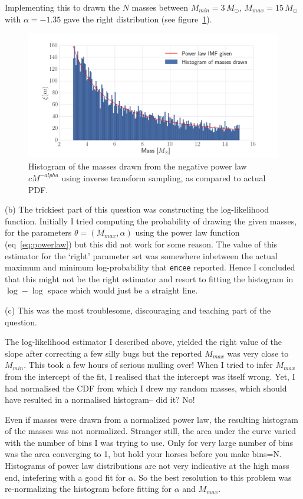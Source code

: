 \documentclass[12pt,usletter,english]{article}
\begin{document}
Implementing this to drawn the $N$ masses between $M_{min}=3 \,
M_{\odot}$, $M_{max}=15 \, M_{\odot}$ with $\alpha = -1.35$ gave the
right distribution (see figure~\ref{fig:powerlaw_masses}).

\begin{figure}[!h]
  \centering \includegraphics[width=13cm]{powerlaw_masses.png}
  \caption{Histogram of the masses drawn from the negative power law
    $cM^{-alpha}$ using inverse transform sampling, as compared to
    actual PDF. 
    \label{fig:powerlaw_masses}}
\end{figure}

(b) The trickiest part of this question was constructing the
log-likelihood function. Initially I tried computing the probability
of drawing the given masses, for the parameters $\theta =
(M_{max},\alpha)$ using the power law function (eq~\ref{eq:powerlaw})
but this did not work for some reason. The value of this estimator for
the `right' parameter set was somewhere inbetween the actual maximum
and minimum log-probability that \texttt{emcee} reported. Hence I
concluded that this might not be the right estimator and resort to
fitting the histogram in $\log-\log$ space which would just be a
straight line.


(c) This was the most troublesome, discouraging and teaching part of
the question.

The log-likelihood estimator I described above, yielded the right
value of the slope after correcting a few silly bugs but the reported
$M_{max}$ was very close to $M_{min}$. This took a few hours of
serious mulling over! When I tried to infer $M_{max}$ from the
intercept of the fit, I realised that the intercept was itself
wrong. Yet, I had normalised the CDF from which I drew my random
masses, which should have resulted in a normalised histogram-- did it?
No!

Even if masses were drawn from a normalized power law, the resulting
histogram of the masses was not normalized. Stranger still, the area
under the curve varied with the number of bins I was trying to
use. Only for very large number of bins was the area converging to 1,
but hold your horses before you make bins=N. Histograms of power law
distributions are not very indicative at the high mass end, intefering
with a good fit for $\alpha$. So the best resolution to this problem
was re-normalizing the histogram before fitting for $\alpha$ and
$M_{max}$.
\end{document}
